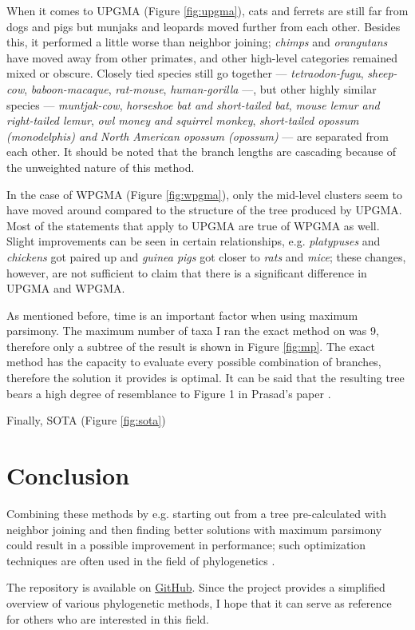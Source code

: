 \documentclass[11pt,twocolumn]{article}
\begin{document}
When it comes to UPGMA (Figure \ref{fig:upgma}), cats and ferrets are still far from dogs and pigs but munjaks and leopards moved further from each other. Besides this, it performed a little worse than neighbor joining; \textit{chimps} and \textit{orangutans} have moved away from other primates, and other high-level categories remained mixed or obscure. Closely tied species still go together — \textit{tetraodon-fugu}, \textit{sheep-cow}, \textit{baboon-macaque}, \textit{rat-mouse}, \textit{human-gorilla} —, but other highly similar species — \textit{muntjak-cow}, \textit{horseshoe bat and short-tailed bat}, \textit{mouse lemur and right-tailed lemur}, \textit{owl money and squirrel monkey}, \textit{short-tailed opossum (monodelphis) and North American opossum (opossum)} — are separated from each other. It should be noted that the branch lengths are cascading because of the unweighted nature of this method.

In the case of WPGMA (Figure \ref{fig:wpgma}), only the mid-level clusters seem to have moved around compared to the structure of the tree produced by UPGMA. Most of the statements that apply to UPGMA are true of WPGMA as well. Slight improvements can be seen in certain relationships, e.g. \textit{platypuses} and \textit{chickens} got paired up and \textit{guinea pigs} got closer to \textit{rats} and \textit{mice}; these changes, however, are not sufficient to claim that there is a significant difference in UPGMA and WPGMA.

As mentioned before, time is an important factor when using maximum parsimony. The maximum number of taxa I ran the exact method on was 9, therefore only a subtree of the result is shown in Figure \ref{fig:mp}. The exact method has the capacity to evaluate every possible combination of branches, therefore the solution it provides is optimal. It can be said that the resulting tree bears a high degree of resemblance to Figure 1 in Prasad's paper \cite{Prasad2008}.

Finally, SOTA (Figure \ref{fig:sota})

\section{Conclusion}

Combining these methods by e.g. starting out from a tree pre-calculated with neighbor joining and then finding better solutions with maximum parsimony could result in a possible improvement in performance; such optimization techniques are often used in the field of phylogenetics \cite{Zvelebil2007}.

The repository is available on \href{https://github.com/Leena01/computational_biology}{GitHub}. Since the project provides a simplified overview of various phylogenetic methods, I hope that it can serve as reference for others who are interested in this field.


\nocite{*}

\end{document}
